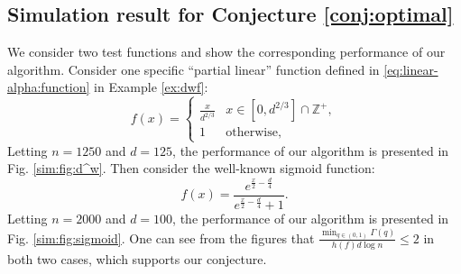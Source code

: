 \documentclass[onecolumn,letterpaper]{IEEEtran}
\newcommand{\cp}{{q}}
\newcommand{\fh}{{h(f)}}
\newcommand{\ftau}{{\Gamma}}
\newcommand{\fT}{{\ftau(\cp)}}
\begin{document}
\newpage
\subsection{Simulation result for Conjecture \ref{conj:optimal}}


We consider two test functions and show the corresponding performance of our algorithm. Consider one specific ``partial linear'' function defined in \eqref{eq:linear-alpha:function} in Example \ref{ex:dwf}:
\begin{equation} \label{eq:simu:conj:dw}
    f(x) = 
    \left\{
    \begin{array}{ll}
    \frac{x}{d^{2/3}} & x \in \left[0, d^{2/3}\right]\cap \mathbb{Z}^+, \\
    1 & \text{otherwise} ,
    \end{array} 
    \right.
\end{equation}
Letting $n=1250$ and $d=125$, the performance of our algorithm is presented in Fig. \ref{sim:fig:d^w}. Then consider the well-known sigmoid function:
\begin{equation} \label{eq:simu:conj:sigmoid}
    f(x) = \frac{e^{\frac{x}{2} - \frac{d}{4}}}{e^{\frac{x}{2} - \frac{d}{4}}+1}.
\end{equation}
Letting $n=2000$ and $d=100$, the performance of our algorithm is presented in Fig. \ref{sim:fig:sigmoid}. One can see from the figures that $\frac{\min_{\cp\in(0,1)} \fT}{\fh d \log n} \le 2$ in both two cases, which supports our conjecture. 
\end{document}

